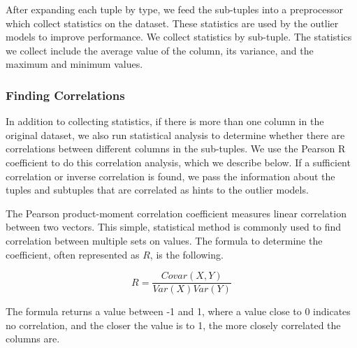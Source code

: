 
After expanding each tuple by type, we feed the sub-tuples into a preprocessor which collect statistics on the dataset.
These statistics are used by the outlier models to improve performance.
We collect statistics by sub-tuple.
The statistics we collect include the average value of the column, its variance, and the maximum and minimum values. 


\subsubsection{Finding Correlations}
In addition to collecting statistics, if there is more than one column in the original dataset, we also run statistical analysis to determine whether there are correlations between different columns in the sub-tuples.
We use the Pearson R coefficient to do this correlation analysis, which we describe below.
If a sufficient correlation or inverse correlation is found, we pass the information about the tuples and subtuples that are correlated as hints to the outlier models.

The Pearson product-moment correlation coefficient measures linear correlation between two vectors.
This simple, statistical method is commonly used to find correlation between multiple sets on values.
The formula to determine the coefficient, often represented as $R$, is the following.

$$
R = \frac{Covar(X,Y)}{Var(X)Var(Y)}
$$

The formula returns a value between -1 and 1, where a value close to 0 indicates no correlation, and the closer the value is to 1, the more closely correlated the columns are.


